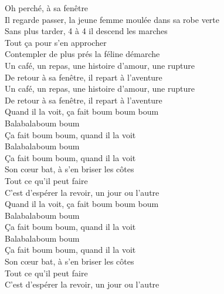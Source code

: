 \documentclass{novel}
\begin{document}
\begin{multicols}{2}
Oh perché, à sa fenêtre \\
Il regarde passer, la jeune femme moulée dans sa robe verte \\
Sans plus tarder, 4 à 4 il descend les marches \\
Tout ça pour s'en approcher \\
Contempler de plus prés la féline démarche \\
Un café, un repas, une histoire d'amour, une rupture \\
De retour à sa fenêtre, il repart à l'aventure \\
Un café, un repas, une histoire d'amour, une rupture \\
De retour à sa fenêtre, il repart à l'aventure \\

Quand il la voit, ça fait boum boum boum \\
Balabalaboum boum \\
Ça fait boum boum, quand il la voit \\
Balabalaboum boum \\
Ça fait boum boum, quand il la voit \\
Son cœur bat, à s'en briser les côtes \\
Tout ce qu'il peut faire \\
C'est d'espérer la revoir, un jour ou l'autre \\

Quand il la voit, ça fait boum boum boum \\
Balabalaboum boum \\
Ça fait boum boum, quand il la voit \\
Balabalaboum boum \\
Ça fait boum boum, quand il la voit \\
Son cœur bat, à s'en briser les côtes \\
Tout ce qu'il peut faire \\
C'est d'espérer la revoir, un jour ou l'autre
\end{multicols}
\end{document}

